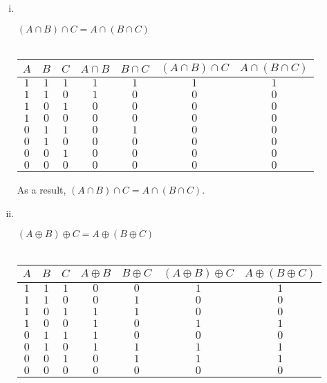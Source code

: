 \documentclass[11pt]{article}
\begin{document}
\begin{enumerate}[a)]
\begin{enumerate}[(i)]
            \item ~ 
\begin{table}[H]
    \centering
    $(A \cap B) \cap C = A \cap (B \cap C)$ \\
    ~ \\
    \begin{tabular}{c|c|c|c|c|c|c}
         $A$ & $B$ & $C$ & $A \cap B$ & $B \cap C$ & $(A \cap B) \cap C$ & $A \cap (B \cap C)$ \\
         \hline
         $1$ & $1$ & $1$ & $1$ & $1$ & $1$ & $1$ \\
         $1$ & $1$ & $0$ & $1$ & $0$ & $0$ & $0$ \\
         $1$ & $0$ & $1$ & $0$ & $0$ & $0$ & $0$ \\
         $1$ & $0$ & $0$ & $0$ & $0$ & $0$ & $0$ \\
         $0$ & $1$ & $1$ & $0$ & $1$ & $0$ & $0$ \\
         $0$ & $1$ & $0$ & $0$ & $0$ & $0$ & $0$ \\
         $0$ & $0$ & $1$ & $0$ & $0$ & $0$ & $0$ \\
         $0$ & $0$ & $0$ & $0$ & $0$ & $0$ & $0$ \\
         
    \end{tabular}

    As a result, $(A \cap B) \cap C = A \cap (B \cap C)$. \\
\end{table}


\pagebreak

            \item ~
\begin{table}[H]
    \centering
    $(A \oplus B) \oplus C = A \oplus (B \oplus C)$ \\
    ~ \\
    \begin{tabular}{c|c|c|c|c|c|c}
         $A$ & $B$ & $C$ & $A \oplus B$ & $B \oplus C$ & $(A \oplus B) \oplus C$ & $A \oplus (B \oplus C)$ \\
         \hline
         $1$ & $1$ & $1$ & $0$ & $0$ & $1$ & $1$ \\
         $1$ & $1$ & $0$ & $0$ & $1$ & $0$ & $0$ \\
         $1$ & $0$ & $1$ & $1$ & $1$ & $0$ & $0$ \\
         $1$ & $0$ & $0$ & $1$ & $0$ & $1$ & $1$ \\
         $0$ & $1$ & $1$ & $1$ & $0$ & $0$ & $0$ \\
         $0$ & $1$ & $0$ & $1$ & $1$ & $1$ & $1$ \\
         $0$ & $0$ & $1$ & $0$ & $1$ & $1$ & $1$ \\
         $0$ & $0$ & $0$ & $0$ & $0$ & $0$ & $0$ \\
         

\end{tabular}
\end{table}
\end{enumerate}
\end{enumerate}
\end{document}
